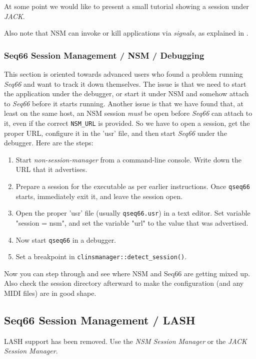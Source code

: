    At some point we would like to present a small tutorial showing a session
   under \textsl{JACK}.

   Also note that NSM can invoke or kill applications via
   \textsl{signals}, as explained in 
   .

\subsubsection{Seq66 Session Management / NSM / Debugging}
\label{subsubsec:sessions_debugging}

   This section is oriented towards advanced users who found a problem running
   \textsl{Seq66} and want to track it down themselves.  The issue is that we
   need to start the application under the debugger, or start it under NSM and
   somehow attach to \textsl{Seq66} before it starts running.  Another issue is
   that we have found that, at least on the same host, an NSM session
   \textsl{must} be open before \textsl{Seq66} can attach to it, even if the
   correct \texttt{NSM\_URL} is provided.
   So we have to open a session, get the proper URL, configure it in the 'usr'
   file, and then start \textsl{Seq66} under the debugger.
   Here are the steps:

   \begin{enumerate}
      \item Start \textsl{non-session-manager} from a command-line console.
         Write down the URL that it advertises.
      \item Prepare a session for the executable as per earlier instructions.
         Once \texttt{qseq66} starts, immediately exit it, and leave the session
         open.
      \item Open the proper 'usr' file (usually \texttt{qseq66.usr}) in a 
         text editor.  Set variable "session = nsm", and set the variable "url"
         to the value that was advertised.
      \item Now start \texttt{qseq66} in a debugger.
      \item Set a breakpoint in \texttt{clinsmanager::detect\_session()}.
   \end{enumerate}
   
   Now you can step through and see where NSM and Seq66 are getting mixed up.
   Also check the session directory afterward to make the configuration
   (and any MIDI files) are in good shape.

\subsection{Seq66 Session Management / LASH}
\label{subsec:sessions_lash}

   LASH support has been removed.  Use the \textsl{NSM Session Manager} or
   the \textsl{JACK Session Manager}.

